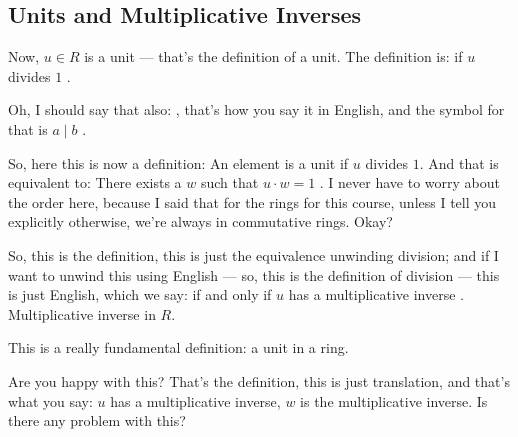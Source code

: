 \subsection{Units and Multiplicative Inverses}

\begin{speech}[00:24:29 - 00:26:22]
Now, $u \in R$ is a unit  --- that's the definition of a unit. The definition is: if $u$ divides $1$ .

Oh, I should say that also: , that's how you say it in English, and the symbol for that is $a \mid b$ .

So, here this is now a definition: An element is a unit if $u$ divides $1$. And that is equivalent to: There exists a $w$ such that  $u \cdot w = 1$ . I never have to worry about the order here, because I said that for the rings for this course, unless I tell you explicitly otherwise, we're always in commutative rings. Okay?

So, this is the definition, this is just the equivalence unwinding division; and if I want to unwind this using English --- so, this is the definition of division  --- this is just English, which we say: if and only if $u$ has a multiplicative inverse . Multiplicative inverse in $R$.

This is a really fundamental definition: a unit in a ring.

Are you happy with this? That's the definition, this is just translation, and that's what you say: $u$ has a multiplicative inverse, $w$ is the multiplicative inverse. Is there any problem with this?
\end{speech}

